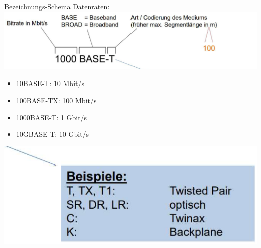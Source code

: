 \begin{theorem}{Bezeichnungs-Schema}
    Datenraten:\\
    \includegraphics[width=0.8\linewidth]{images/ethernet_bezeichnungsschema.png}\\
    \begin{minipage}{0.45\linewidth}
    \begin{itemize}
        \item 10BASE-T: 10 Mbit/s
        \item 100BASE-TX: 100 Mbit/s
        \item 1000BASE-T: 1 Gbit/s
        \item 10GBASE-T: 10 Gbit/s
    \end{itemize}
    \end{minipage}
    \begin{minipage}{0.45\linewidth}
        \includegraphics[width=1\linewidth]{images/ethernet_bsp_bezeichnung.png}
    \end{minipage}
\end{theorem}

